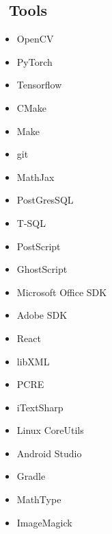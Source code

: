 \documentclass{article}
\begin{document}
\subsection*{\faWrench \ Tools} \vspace{-1em}
\begin{multicols}{4}
\small \begin{itemize}
    \item[\faImage] OpenCV
    \item[\faFire] PyTorch
    \item[\faGoogle] Tensorflow
    \item[\faBuildingO] CMake
    \item[\faBuilding] Make
    \item[\faGitSquare]git
    \item[\faRocket] MathJax
    \item[\faDatabase] PostGresSQL
    \item[\faDatabase] T-SQL
    \item[\faPaperPlaneO] PostScript
    \item[\faPaperPlane] GhostScript
    \item[\faWindows] Microsoft Office SDK
    \item[\faFilePdfO] Adobe SDK
    \item[\faSitemap] React
    \item[\faTh] libXML
    \item[\faRegistered] PCRE
    \item[\faHashtag] iTextSharp
    \item[\faLinux] Linux CoreUtils
    \item[\faAndroid] Android Studio
    \item[\faGlide] Gradle
    \item[\faSubscript] MathType
    \item[\faImage] ImageMagick
\end{itemize}
\end{multicols}

\end{document}
